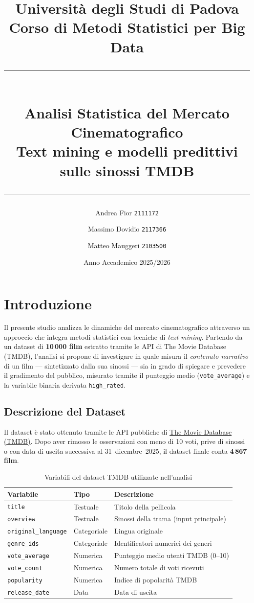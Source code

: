 \documentclass[12pt, a4paper]{article}
\title{
  \vspace{-1cm}
  {\Large Università degli Studi di Padova} \\[0.4cm]
  {\large Corso di Metodi Statistici per Big Data} \\[1cm]
  \rule{\linewidth}{0.5pt} \\[0.4cm]
  {\LARGE \textbf{Analisi Statistica del Mercato Cinematografico}} \\[0.3cm]
  {\large Text mining e modelli predittivi sulle sinossi TMDB} \\
  \rule{\linewidth}{0.5pt}
}
\author{
  Andrea Fior \texttt{2111172} \and
  Massimo Dovidio \texttt{2117366} \and
  Matteo Mauggeri \texttt{2103500}
}
\date{Anno Accademico 2025/2026}
\newcommand{\code}[1]{\texttt{#1}}
\begin{document}
\maketitle
\thispagestyle{empty}
\newpage
\tableofcontents
\newpage

\section{Introduzione}

Il presente studio analizza le dinamiche del mercato cinematografico
attraverso un approccio che integra metodi statistici con tecniche
di \emph{text mining}.
Partendo da un dataset di \textbf{10\,000 film} estratto tramite le
API di The Movie Database (TMDB), l'analisi si propone di
investigare in quale misura il \emph{contenuto narrativo} di un
film --- sintetizzato dalla sua sinossi --- sia in grado di
spiegare e prevedere il gradimento del pubblico, misurato tramite
il punteggio medio (\code{vote\_average}) e la variabile binaria
derivata \code{high\_rated}.

\subsection{Descrizione del Dataset}

Il dataset è stato ottenuto tramite le API pubbliche di
\href{https://www.themoviedb.org/}{The Movie Database (TMDB)}.
Dopo aver rimosso le osservazioni con meno di 10 voti, prive di
sinossi o con data di uscita successiva al 31~dicembre~2025,
il dataset finale conta \textbf{4\,867 film}.

\begin{table}[H]
\centering
\caption{Variabili del dataset TMDB utilizzate nell'analisi}
\smallskip
\begin{tabular}{@{}llp{7cm}@{}}
\toprule
\textbf{Variabile} & \textbf{Tipo} & \textbf{Descrizione} \\
\midrule
\code{title}              & Testuale    & Titolo della pellicola \\
\code{overview}           & Testuale    & Sinossi della trama (input principale) \\
\code{original\_language} & Categoriale & Lingua originale \\
\code{genre\_ids}         & Categoriale & Identificatori numerici dei generi \\
\code{vote\_average}      & Numerica    & Punteggio medio utenti TMDB (0--10) \\
\code{vote\_count}        & Numerica    & Numero totale di voti ricevuti \\
\code{popularity}         & Numerica    & Indice di popolarità TMDB \\
\code{release\_date}      & Data        & Data di uscita \\
\bottomrule
\end{tabular}
\end{table}
\end{document}
